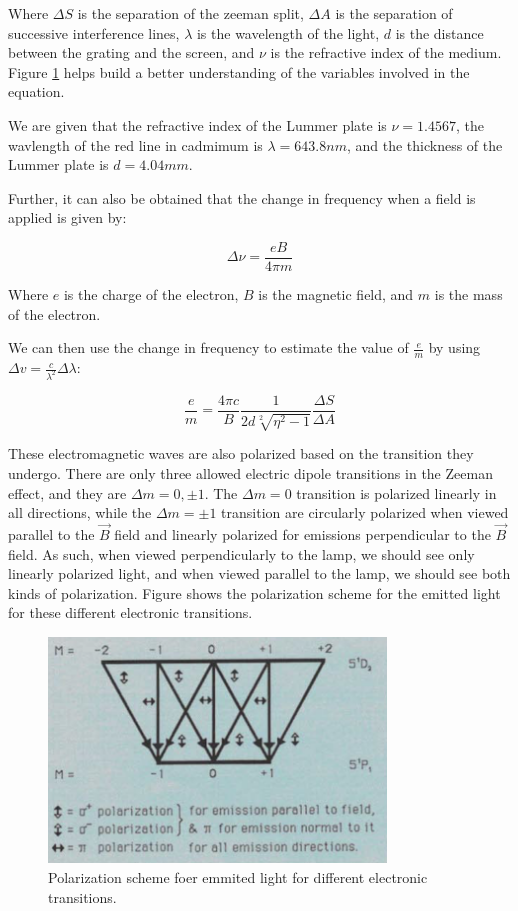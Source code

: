 Where $\Delta S$ is the separation of the zeeman split, $\Delta A$ is the separation of successive interference lines, $\lambda$ is the wavelength of the light, $d$ is the distance between the grating and the screen, and $\nu$ is the refractive index of the medium.
Figure \ref{fig:variables_lambda} helps build a better understanding of the variables involved in the equation.


We are given that the refractive index of the Lummer plate is $\nu = 1.4567$, the wavlength of the red line in cadmimum is $\lambda = 643.8 nm$, and the thickness of the Lummer plate is $d = 4.04 mm$.

Further, it can also be obtained that the change in frequency when a field is applied is given by:

\begin{equation}
    \Delta \nu = \frac{e B}{4\pi m}
\end{equation}

Where $e$ is the charge of the electron, $B$ is the magnetic field, and $m$ is the mass of the electron.

We can then use the change in frequency to estimate the value of $\frac{e}{m}$ by using $\Delta v = \frac{c}{\lambda^2} \Delta \lambda$:

\begin{equation} \label{eq:em_relationship}
    \frac{e}{m} =
    \frac{4 \pi c}{B} \frac{1}{2d\sqrt[2]{\eta^2 - 1}} \frac{\Delta S}{\Delta A}
\end{equation}

These electromagnetic waves are also polarized based on the transition they undergo. There are only three allowed electric dipole transitions in the Zeeman effect, and they are $\Delta m = 0, \pm1$. The $\Delta m = 0$ transition is polarized linearly in all directions, while the $\Delta m = \pm1$ transition are circularly polarized when viewed parallel to the $\vec{B}$ field and linearly polarized for emissions perpendicular to the $\vec{B}$ field. As such, when viewed perpendicularly to the lamp, we should see only linearly polarized light, and when viewed parallel to the lamp, we should see both kinds of polarization. Figure \cite{ZeemanEffectLab} shows the polarization scheme for the emitted light for these different electronic transitions.

\begin{figure}
    \centering
    \includegraphics[width=0.8\textwidth]{intro/polarization_scheme.png}
    \caption{Polarization scheme foer emmited light for different electronic transitions.}
    \label{fig:variables_lambda}
\end{figure}